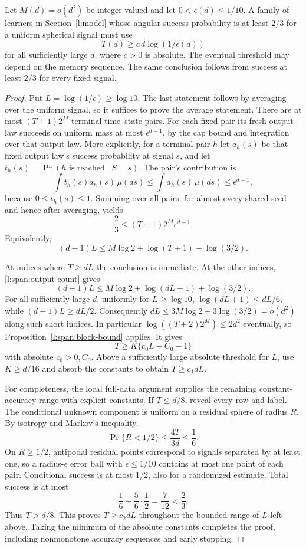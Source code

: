 \begin{theorem}
\label{l:span:theorem}
Let \(M(d)=o(d^2)\) be integer-valued and let
\(0<\epsilon(d)\le1/10\).  A family of learners in
Section~\ref{l:model} whose angular success probability is at least
\(2/3\) for a uniform spherical signal must use
\[
 T(d)\ge c\,d\log(1/\epsilon(d))
\]
for all sufficiently large \(d\), where \(c>0\) is absolute.
The eventual threshold may depend on the memory sequence.  The
same conclusion follows from success at least \(2/3\) for every
fixed signal.
\end{theorem}
\begin{proof}
Put \(L=\log(1/\epsilon)\ge\log10\).  The last statement follows by
averaging over the uniform signal, so it suffices to prove the average
statement.  There are at most \((T+1)2^M\) terminal time--state
pairs.  For each fixed pair its fresh output law succeeds on uniform
mass at most \(\epsilon^{d-1}\), by the cap bound and integration
over that output law.  More explicitly, for a terminal pair \(h\)
let \(a_h(s)\) be that fixed output law's success probability at
signal \(s\), and let \(t_h(s)=\Pr(h\text{ is reached}\mid S=s)\).
The pair's contribution is
\[
 \int t_h(s)a_h(s)\,\mu(ds)
 \le\int a_h(s)\,\mu(ds)\le\epsilon^{d-1},
\]
because \(0\le t_h(s)\le1\).  Summing over all pairs, for almost
every shared seed and hence after averaging, yields
\[
 \frac23\le (T+1)2^M\epsilon^{d-1}.
\]
Equivalently,
\begin{equation}
 (d-1)L\le M\log2+\log(T+1)+\log(3/2).
 \label{l:span:output-count}
\end{equation}

At indices where \(T\ge dL\) the conclusion is immediate.  At the
other indices, \eqref{l:span:output-count} gives
\[
 (d-1)L\le M\log2+\log(dL+1)+\log(3/2).
\]
For all sufficiently large \(d\), uniformly for \(L\ge\log10\),
\(\log(dL+1)\le dL/6\), while \((d-1)L\ge dL/2\).
Consequently \(dL\le3M\log2+3\log(3/2)=o(d^2)\) along such
short indices.  In particular \(\log((T+2)2^M)\le2d^2\) eventually,
so Proposition~\ref{l:span:block-bound} applies.  It gives
\[
 T\ge K\{c_0L-C_0-1\}
\]
with absolute \(c_0>0,C_0\).  Above a sufficiently large absolute
threshold for \(L\), use \(K\ge d/16\) and absorb the constants to
obtain \(T\ge c_1dL\).

For completeness, the local full-data argument supplies the remaining
constant-accuracy range with explicit constants.  If \(T\le d/8\),
reveal every row and label.  The conditional unknown component is
uniform on a residual sphere of radius \(R\).  By isotropy and
Markov's inequality,
\[
 \Pr\{R<1/2\}\le \frac{4T}{3d}\le\frac16.
\]
On \(R\ge1/2\), antipodal residual points correspond to signals
separated by at least one, so a radius-\(\epsilon\) error ball with
\(\epsilon\le1/10\) contains at most one point of each pair.
Conditional success is at most \(1/2\), also for a randomized
estimate.  Total success is at most
\[
 \frac16+\frac56\cdot\frac12=\frac7{12}<\frac23.
\]
Thus \(T>d/8\).  This proves \(T\ge c_2dL\) throughout the bounded
range of \(L\) left above.  Taking the minimum of the absolute
constants completes the proof, including nonmonotone accuracy
sequences and early stopping.
\end{proof}
